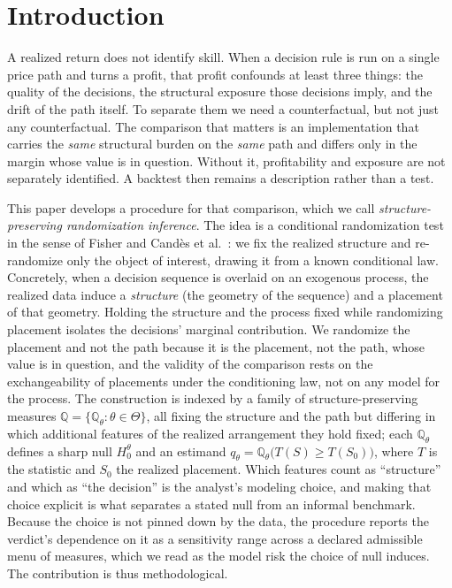 \documentclass[risks,article,submit,pdftex,oneauthor]{Definitions/mdpi}
\begin{document}
\maketitle

\section{Introduction}

A realized return does not identify skill. When a decision rule is run on a single
price path and turns a profit, that profit confounds at least three things: the
quality of the decisions, the structural exposure those decisions imply, and the
drift of the path itself. To separate them we need a counterfactual, but not just any
counterfactual. The comparison that matters is an implementation that carries the
\emph{same} structural burden on the \emph{same} path and differs only in the margin
whose value is in question. Without it, profitability and exposure are not
separately identified. A backtest then remains a description rather than a test.

This paper develops a procedure for that comparison, which we call
\emph{structure-preserving randomization inference}. The idea is a conditional
randomization test in the sense of Fisher \citep{Fisher1935} and Cand\`es et al.\
\citep{Candes2018}: we fix the realized structure and re-randomize only the object of
interest, drawing it from a known conditional law. Concretely, when a decision sequence is overlaid
on an exogenous process, the realized data induce a \emph{structure} (the geometry of
the sequence) and a placement of that geometry. Holding the structure and the process
fixed while randomizing placement isolates the decisions' marginal contribution. We
randomize the placement and not the path because it is the placement, not the path,
whose value is in question, and the validity of the comparison rests on the
exchangeability of placements under the conditioning law, not on any model for the
process. The construction is indexed by a family of
structure-preserving measures $\mathbb{Q}=\{\mathbb{Q}_\theta:\theta\in\Theta\}$, all
fixing the structure and the path but differing in which additional features of the
realized arrangement they hold fixed; each $\mathbb{Q}_\theta$ defines a sharp null
$H_0^\theta$ and an estimand $q_\theta=\mathbb{Q}_\theta\big(T(S)\ge T(S_0)\big)$, where
$T$ is the statistic and $S_0$ the realized placement. Which features count as
``structure'' and which as ``the decision'' is the analyst's modeling choice,
and making that choice explicit is what separates a stated null from an informal
benchmark. Because the choice is not pinned down by the data, the procedure reports
the verdict's dependence on it as a sensitivity range across a declared admissible
menu of measures, which we read as the model risk the choice of null induces. The
contribution is thus methodological.
\end{document}
